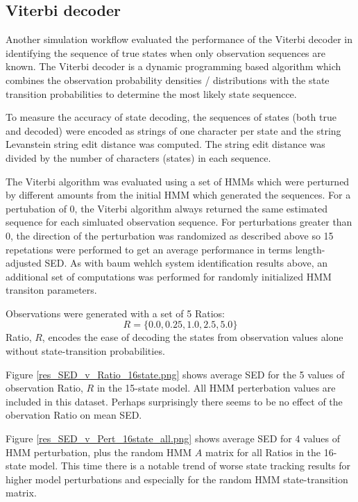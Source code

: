 \subsection{Viterbi decoder}

Another simulation workflow evaluated the performance of the Viterbi decoder in identifying
the sequence of true states when only observation sequences are known.  The Viterbi decoder is a
 dynamic programming based algorithm which combines the observation probability densities / distributions
with the state transition probabilities 
to determine the most likely state sequencce.
 

To measure the accuracy of state decoding, the sequences of states (both true and decoded) were encoded 
as strings of one character per state and the string Levanstein string edit distance was computed.
The string edit distance was divided by the number of characters (states) in each sequence.

The Viterbi algorithm was evaluated using a set of HMMs which were perturned by different amounts from the 
initial HMM which generated the sequences.  For a pertubation of 0, the Viterbi algorithm always returned 
the same estimated sequence for each simluated observation sequence.  
For perturbations greater than 0, the direction of the perturbation was randomized as described above so 
15 repetations were performed to get an average performance in terms length-adjusted SED.
As with baum wehlch system identification results above, 
an additional set of computations was performed for randomly initialized HMM transiton parameters.

Observations were generated with a set of 5 Ratios:
\[
R = \{0.0, 0.25, 1.0, 2.5, 5.0\}
\]
Ratio, $R$, encodes the ease of decoding the states from observation values alone without state-transition
probabilities. 

Figure \ref{res_SED_v_Ratio_16state.png} shows average SED for the 5 values of observation Ratio, $R$ in the 15-state model.
All HMM perterbation values are included in this dataset.  Perhaps surprisingly there seems to be no effect of the obervation Ratio on 
mean SED. 



Figure \ref{res_SED_v_Pert_16state_all.png} shows average SED for 4 values of HMM perturbation,  plus the random HMM $A$ matrix for 
all Ratios in the 16-state model.  This time there is a notable trend of worse state tracking results for higher model perturbations 
and especially for the random HMM state-transition matrix. 







